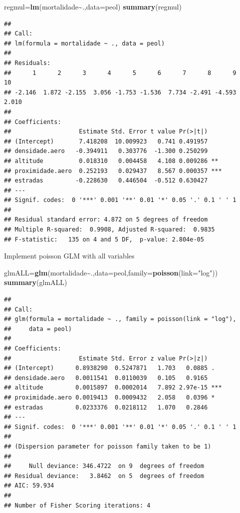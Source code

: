 \documentclass[
]{book}
\newenvironment{Shaded}{\begin{snugshade}}{\end{snugshade}}
\newcommand{\AttributeTok}[1]{\textcolor[rgb]{0.13,0.29,0.53}{#1}}
\newcommand{\FunctionTok}[1]{\textcolor[rgb]{0.13,0.29,0.53}{\textbf{#1}}}
\newcommand{\NormalTok}[1]{#1}
\newcommand{\OtherTok}[1]{\textcolor[rgb]{0.56,0.35,0.01}{#1}}
\newcommand{\SpecialCharTok}[1]{\textcolor[rgb]{0.81,0.36,0.00}{\textbf{#1}}}
\newcommand{\StringTok}[1]{\textcolor[rgb]{0.31,0.60,0.02}{#1}}
\begin{document}
\begin{Shaded}
\begin{Highlighting}[]
\NormalTok{regmul}\OtherTok{=}\FunctionTok{lm}\NormalTok{(mortalidade}\SpecialCharTok{\textasciitilde{}}\NormalTok{.,}\AttributeTok{data=}\NormalTok{peol)}
\FunctionTok{summary}\NormalTok{(regmul)}
\end{Highlighting}
\end{Shaded}

\begin{verbatim}
## 
## Call:
## lm(formula = mortalidade ~ ., data = peol)
## 
## Residuals:
##      1      2      3      4      5      6      7      8      9     10 
## -2.146  1.872 -2.155  3.056 -1.753 -1.536  7.734 -2.491 -4.593  2.010 
## 
## Coefficients:
##                   Estimate Std. Error t value Pr(>|t|)    
## (Intercept)       7.418208  10.009923   0.741 0.491957    
## densidade.aero   -0.394911   0.303776  -1.300 0.250299    
## altitude          0.018310   0.004458   4.108 0.009286 ** 
## proximidade.aero  0.252193   0.029437   8.567 0.000357 ***
## estradas         -0.228630   0.446504  -0.512 0.630427    
## ---
## Signif. codes:  0 '***' 0.001 '**' 0.01 '*' 0.05 '.' 0.1 ' ' 1
## 
## Residual standard error: 4.872 on 5 degrees of freedom
## Multiple R-squared:  0.9908, Adjusted R-squared:  0.9835 
## F-statistic:   135 on 4 and 5 DF,  p-value: 2.804e-05
\end{verbatim}

Implement poisson GLM with all variables

\begin{Shaded}
\begin{Highlighting}[]
\NormalTok{glmALL}\OtherTok{=}\FunctionTok{glm}\NormalTok{(mortalidade}\SpecialCharTok{\textasciitilde{}}\NormalTok{.,}\AttributeTok{data=}\NormalTok{peol,}\AttributeTok{family=}\FunctionTok{poisson}\NormalTok{(}\AttributeTok{link=}\StringTok{"log"}\NormalTok{))}
\FunctionTok{summary}\NormalTok{(glmALL)}
\end{Highlighting}
\end{Shaded}

\begin{verbatim}
## 
## Call:
## glm(formula = mortalidade ~ ., family = poisson(link = "log"), 
##     data = peol)
## 
## Coefficients:
##                   Estimate Std. Error z value Pr(>|z|)    
## (Intercept)      0.8938290  0.5247871   1.703   0.0885 .  
## densidade.aero   0.0011541  0.0110039   0.105   0.9165    
## altitude         0.0015897  0.0002014   7.892 2.97e-15 ***
## proximidade.aero 0.0019413  0.0009432   2.058   0.0396 *  
## estradas         0.0233376  0.0218112   1.070   0.2846    
## ---
## Signif. codes:  0 '***' 0.001 '**' 0.01 '*' 0.05 '.' 0.1 ' ' 1
## 
## (Dispersion parameter for poisson family taken to be 1)
## 
##     Null deviance: 346.4722  on 9  degrees of freedom
## Residual deviance:   3.8462  on 5  degrees of freedom
## AIC: 59.934
## 
## Number of Fisher Scoring iterations: 4
\end{verbatim}
\end{document}
